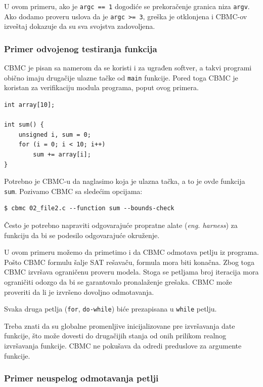 U ovom primeru, ako je \texttt{argc\ ==\ 1} dogodiće se prekoračenje granica niza \texttt{argv}. Ako dodamo proveru uslova da je \texttt{argc\ \textgreater{}=\ 3}, greška je otklonjena i CBMC-ov izveštaj dokazuje da su sva svojstva zadovoljena.

\subsubsection{Primer odvojenog testiranja funkcija}\label{primer-odvojenog-testiranja-funkcija}

CBMC je pisan sa namerom da se koristi i za ugrađen softver, a takvi programi obično imaju drugačije ulazne tačke od \texttt{main} funkcije. Pored toga CBMC je koristan za verifikaciju modula programa, poput ovog primera.

\begin{verbatim}
int array[10];

int sum() {
    unsigned i, sum = 0;
    for (i = 0; i < 10; i++)
        sum += array[i];
}
\end{verbatim}

Potrebno je CBMC-u da naglasimo koja je ulazna tačka, a to je ovde funkcija \texttt{sum}. Pozivamo CBMC sa sledećim opcijama:

\begin{verbatim}
$ cbmc 02_file2.c --function sum --bounds-check
\end{verbatim}

Često je potrebno napraviti odgovarajuće propratne alate (\emph{eng. harness}) za funkciju da bi se podesilo odgovarajuće okruženje.

U ovom primeru možemo da primetimo i da CBMC odmotava petlju iz programa. Pošto CBMC formulu šalje SAT rešavaču, formula mora biti konačna. Zbog toga CBMC izvršava ograničenu proveru modela. Stoga se petljama broj iteracija mora ograničiti odozgo da bi se garantovalo pronalaženje grešaka. CBMC može proveriti da li je izvršeno dovoljno odmotavanja.

Svaka druga petlja (\texttt{for}, \texttt{do-while}) biće prezapisana u \texttt{while} petlju.

Treba znati da su globalne promenljive inicijalizovane pre izvršavanja date funkcije, što može dovesti do drugačijih stanja od onih prilikom realnog izvršavanja funkcije. CBMC ne pokušava da odredi preduslove za argumente funkcije.

\subsubsection{Primer neuspelog odmotavanja petlji}\label{primer-neuspelog-odmotavanja-petlji}

